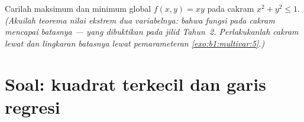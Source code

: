 \begin{exercise}[$\star\star\star$]\label{exo:b1:multivar:12}
Carilah maksimum dan minimum global $f(x, y) = xy$ pada
cakram  $x^2 + y^2 \leq 1$. \emph{(Akuilah teorema nilai
ekstrem dua variabelnya: bahwa fungsi  pada cakram 
mencapai batasnya --- yang dibuktikan pada jilid Tahun~2. Perlakukanlah
cakram  lewat  dan lingkaran batasnya lewat
pemarameteran \cref{exo:b1:multivar:5}.)}
\end{exercise}

\section{Soal: kuadrat terkecil dan garis regresi}

